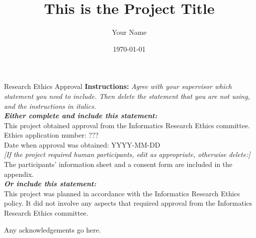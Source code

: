 \documentclass[logo,msc]{Original/infthesis}           %
\begin{document}
\begin{preliminary}

\title{This is the Project Title}

\author{Your Name}

\date{\today}


\maketitle

\newenvironment{ethics}
   {\begin{frontenv}{Research Ethics Approval}{\LARGE}}
   {\end{frontenv}\newpage}

\begin{ethics}
\textbf{Instructions:} \emph{Agree with your supervisor which
statement you need to include. Then delete the statement that you are not using,
and the instructions in italics.\\
\textbf{Either complete and include this statement:}}\\ %
%
This project obtained approval from the Informatics Research Ethics committee.\\
Ethics application number: ???\\
Date when approval was obtained: YYYY-MM-DD\\
%
\emph{[If the project required human participants, edit as appropriate, otherwise delete:]}\\ %
The participants' information sheet and a consent form are included in the appendix.\\
%
\textbf{\emph{Or include this statement:}}\\ %
This project was planned in accordance with the Informatics Research
Ethics policy. It did not involve any aspects that required approval
from the Informatics Research Ethics committee.

\standarddeclaration
\end{ethics}


\begin{acknowledgements}
Any acknowledgements go here.
\end{acknowledgements}


\tableofcontents
\end{preliminary}
\end{document}
